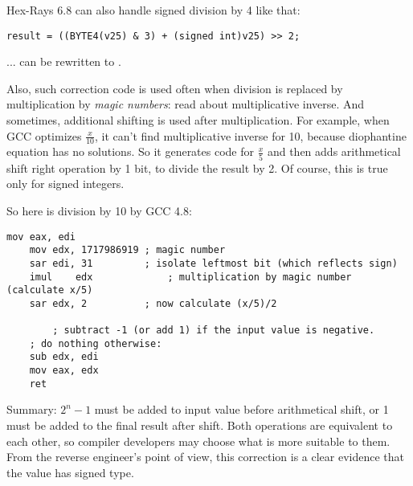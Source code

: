 Hex-Rays 6.8 can also handle signed division by 4 like that:

\begin{lstlisting}
result = ((BYTE4(v25) & 3) + (signed int)v25) >> 2;
\end{lstlisting}

... can be rewritten to .

\myhrule{}

Also, such correction code is used often when division is replaced by multiplication by \textit{magic numbers}:
read \MathForProg about multiplicative inverse.
And sometimes, additional shifting is used after multiplication.
For example, when GCC optimizes $\frac{x}{10}$, it can't find multiplicative inverse for 10, because diophantine equation has no solutions.
So it generates code for $\frac{x}{5}$ and then adds arithmetical shift right operation by 1 bit, to divide the result by 2.
Of course, this is true only for signed integers.

So here is division by 10 by GCC 4.8:

\begin{lstlisting}[style=customasmx86]
	mov	eax, edi
	mov	edx, 1717986919 ; magic number
	sar	edi, 31         ; isolate leftmost bit (which reflects sign)
	imul	edx             ; multiplication by magic number (calculate x/5)
	sar	edx, 2          ; now calculate (x/5)/2

        ; subtract -1 (or add 1) if the input value is negative.
	; do nothing otherwise:
	sub	edx, edi        
	mov	eax, edx
	ret
\end{lstlisting}

Summary: $2^n-1$ must be added to input value before arithmetical shift, or 1 must be added to the final result after shift.
Both operations are equivalent to each other, so compiler developers may choose what is more suitable to them.
From the reverse engineer's point of view, this correction is a clear evidence that the value has signed type.

